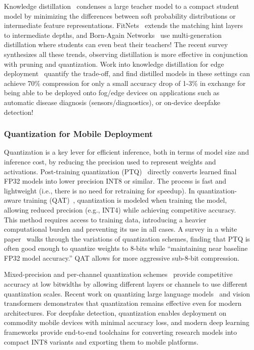Knowledge distillation~\cite{hinton2015distilling} condenses a large teacher model to a compact student model by minimizing the differences between soft probability distributions or intermediate feature representations. FitNets~\cite{romero2015fitnets} extends the matching hint layers to intermediate depths, and Born\hyp Again Networks~\cite{furlanello2018bornagain} use multi\hyp generation distillation where students can even beat their teachers! The recent survey~\cite{gou2021kdsurvey} synthesizes all these trends, observing distillation is more effective in conjunction with pruning and quantization. Work into knowledge distillation for edge deployment~\cite{zhao2023kd_edge,liu2024medical_kd} quantify the trade\hyp off, and find distilled models in these settings can achieve 70\% compression for only a small accuracy drop of 1\hyp 3\% in exchange for being able to be deployed onto fog/edge devices on applications such as automatic disease diagnosis (sensors/diagnostics), or on\hyp device deepfake detection!

\subsubsection*{Quantization for Mobile Deployment}
Quantization is a key lever for efficient inference, both in terms of model size and inference cost, by reducing the precision used to represent weights and activations. Post\hyp training quantization (PTQ)~\cite{jacob2017integeronly,esser2020lsq} directly converts learned final FP32 models into lower precision INT8 or similar. The process is fast and lightweight (i.e., there is no need for retraining for speedup). In quantization\hyp aware training (QAT)~\cite{esser2020lsq,wang2019haq}, quantization is modeled when training the model, allowing reduced precision (e.g., INT4) while achieving competitive accuracy. This method requires access to training data, introducing a heavier computational burden and preventing its use in all cases. A survey in a white paper~\cite{gholami2021quant_survey} walks through the variations of quantization schemes, finding that PTQ is often good enough to quantize weights to 8\hyp bits while ``maintaining near baseline FP32 model accuracy.'' QAT allows for more aggressive sub\hyp 8\hyp bit compression.

Mixed\hyp precision and per\hyp channel quantization schemes~\cite{wang2019haq,esser2020lsq} provide competitive accuracy at low bitwidths by allowing different layers or channels to use different quantization scales. Recent work on quantizing large language models~\cite{frantar2023gptq,yao2022zeroquant} and vision transformers demonstrates that quantization remains effective even for modern architectures. For deepfake detection, quantization enables deployment on commodity mobile devices with minimal accuracy loss, and modern deep learning frameworks provide end\hyp to\hyp end toolchains for converting research models into compact INT8 variants and exporting them to mobile platforms.

